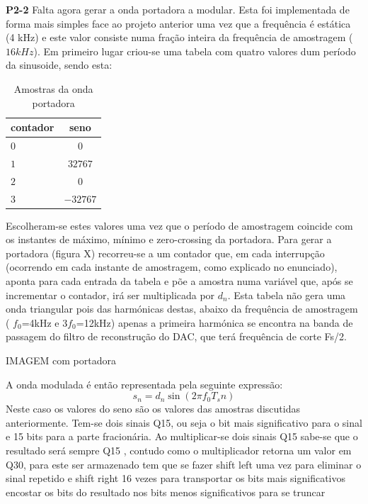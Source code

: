 \documentclass[11pt]{article}
\begin{document}
\vspace{2 mm}
\textbf{P2-2}
Falta agora gerar a onda portadora a modular. Esta foi implementada de forma mais simples face ao projeto anterior uma vez que a frequência é estática (4 kHz) e este valor consiste numa fração inteira da frequência de amostragem ($16 kHz$).
Em primeiro lugar criou-se uma tabela com quatro valores dum período da sinusoide, sendo esta: %
\begin{table}[H]
	\centering
	\caption{Amostras da onda portadora}
	\label{tab:amostras}
	\begin{tabular}[c]{|l||c|}
		\hline \textbf{contador} & \textbf{seno}\\ 
		\hline $ 0 $ & $ 0 $\\ 
		\hline $ 1 $ & $ 32767 $  \\ 
		\hline $ 2 $ & $ 0 $ \\ 
		\hline $ 3 $ & $ -32767 $ \\
		\hline
	\end{tabular}
\end{table}

Escolheram-se estes valores uma vez que o período de amostragem coincide com os instantes de máximo, mínimo e zero-crossing da portadora. Para gerar a portadora (figura X) recorreu-se a um contador que, em cada interrupção (ocorrendo em cada instante de amostragem, como explicado no enunciado), aponta para cada entrada da tabela e põe a amostra numa variável que, após se incrementar o contador, irá ser multiplicada por $d_n$. Esta tabela não gera uma onda triangular pois das harmónicas destas, abaixo da frequência de amostragem ( $f_0$=4kHz e 3$f_0$=12kHz) apenas a primeira harmónica se encontra na banda de passagem do filtro de reconstrução do DAC, que terá frequência de corte Fs/2.

IMAGEM com portadora

A onda modulada é então representada pela seguinte expressão:
\begin{equation}
	s_n= d_n \sin(2 \pi f_0T_sn) 
\end{equation}
Neste caso os valores do seno são os valores das amostras discutidas anteriormente.
Tem-se dois sinais Q15, ou seja o bit mais significativo para o sinal e 15 bits para a parte fracionária. Ao multiplicar-se dois sinais Q15 sabe-se que o resultado será sempre Q15
, contudo como o multiplicador retorna um valor em Q30, para este ser armazenado tem que se fazer shift left uma vez para eliminar o sinal repetido e shift right 16 vezes para transportar os bits mais significativos encostar os bits do resultado nos bits menos significativos para se truncar
\end{document}
